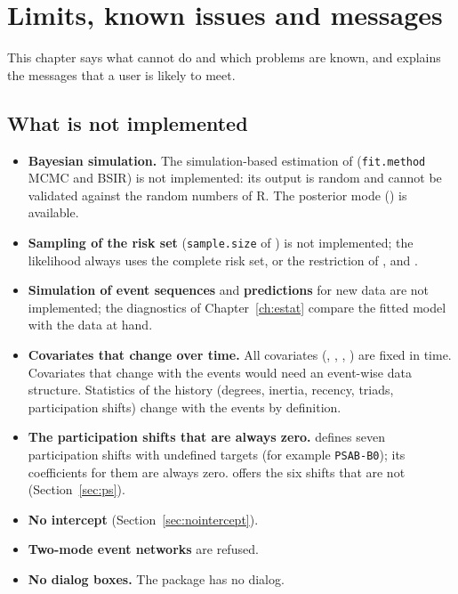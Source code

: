 \chapter{Limits, known issues and messages}\label{ch:limits}

This chapter says what \nwrem{} cannot do and which problems are known, and explains the messages that a user is likely to meet.

\section{What is not implemented}

\begin{itemize}
  \item \textbf{Bayesian simulation.} The simulation-based estimation of \relevent{} (\texttt{fit.method} MCMC and BSIR) is not implemented: its output is random and cannot be validated against the random numbers of R. The posterior mode () is available.
  \item \textbf{Sampling of the risk set} (\texttt{sample.size} of \relevent{}) is not implemented; the likelihood always uses the complete risk set, or the restriction of ,  and .
  \item \textbf{Simulation of event sequences} and \textbf{predictions} for new data are not implemented; the diagnostics of Chapter~\ref{ch:estat} compare the fitted model with the data at hand.
  \item \textbf{Covariates that change over time.} All covariates (, , , ) are fixed in time. Covariates that change with the events would need an event-wise data structure. Statistics of the history (degrees, inertia, recency, triads, participation shifts) change with the events by definition.
  \item \textbf{The participation shifts that are always zero.} \relevent{} defines seven participation shifts with undefined targets (for example \texttt{PSAB-B0}); its coefficients for them are always zero. \nwrem{} offers the six shifts that are not (Section~\ref{sec:ps}).
  \item \textbf{No intercept} (Section~\ref{sec:nointercept}).
  \item \textbf{Two-mode event networks} are refused.
  \item \textbf{No dialog boxes.} The package has no dialog.
\end{itemize}

